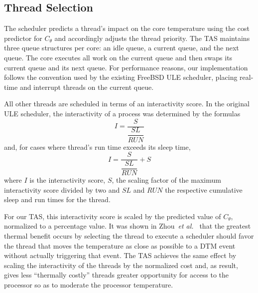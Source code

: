 \documentclass[times, 10pt,twocolumn]{IEEEtran}
\begin{document}
\subsection{Thread Selection}
\label{sec:selection} The scheduler predicts a thread's impact on the
core temperature using the cost predictor for $C_{\theta}$
and accordingly adjusts the thread priority.  The TAS maintains three
queue structures per core: an idle queue, a current queue,
and the next queue. The core executes all work on the current
queue and then swaps its current queue and its next queue. For performance reasons,
our implementation follows the convention used by the existing
FreeBSD ULE scheduler, placing real-time and interrupt threads on the
current queue.

All other threads are scheduled in terms of an interactivity score.  In
the original ULE scheduler, the interactivity of a process was
determined by the formulas
\begin{equation}
  \label{eq:interactsleeprun} I = \dfrac{S}{\dfrac{SL}{RUN}}
\end{equation} and, for cases where thread's run time exceeds its sleep
time,
\begin{equation}
  \label{eq:interactrunsleep} I = \dfrac{S}{\dfrac{SL}{RUN}}+S
\end{equation} where $I$ is the interactivity score, $S$, the scaling
factor of the maximum interactivity score divided by two and $SL$ and
$RUN$ the respective cumulative sleep and run times for the thread.

For our TAS, this interactivity score is scaled by the predicted value
of $C_{\theta}$, normalized to a percentage value.  It was shown in
Zhou~\textit{et al.\ } \cite{Zhou2010b} that the greatest thermal
benefit occurs by selecting the thread to execute a scheduler should
favor the thread that moves the temperature as close as possible to a
DTM event without actually triggering that event.  The TAS achieves the
same effect by scaling the interactivity of the threads by the
normalized cost and, as result, gives less ``thermally costly'' threads
greater opportunity for access to the processor so as to moderate the
processor temperature.
\end{document}
